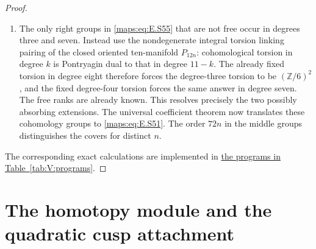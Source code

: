 \documentclass[11pt,a4paper]{article}
\numberwithin{equation}{section}
\theoremstyle{definition}
\begin{document}
\begin{proof}
\begin{enumerate}[label=\arabic*.,leftmargin=*]
\item The only right groups in \eqref{maps:eq:E.S55} that are not free
occur in degrees three and seven.  Instead use the
nondegenerate integral torsion linking pairing of the
closed oriented ten-manifold $P_{12n}$: cohomological
torsion in degree $k$ is Pontryagin dual to that in
degree $11-k$. The already fixed torsion in degree
eight therefore forces the degree-three torsion to
be $(\mathbb Z/6)^2$, and the fixed degree-four torsion
forces the same answer in degree seven. The free
ranks are already known. This resolves precisely
the two possibly absorbing extensions. The universal
coefficient theorem now translates these cohomology
groups to \eqref{maps:eq:E.S51}. The order $72n$ in the middle
groups distinguishes the covers for distinct $n$.
\end{enumerate}
The corresponding exact calculations are implemented in \hyperlink{prog:V:cyclic-cover}{the programs in Table~\ref*{tab:V:programs}}.
\end{proof}

\section{The homotopy module and the quadratic cusp attachment}\label{pub:V:sec-homotopy-module}
\end{document}
